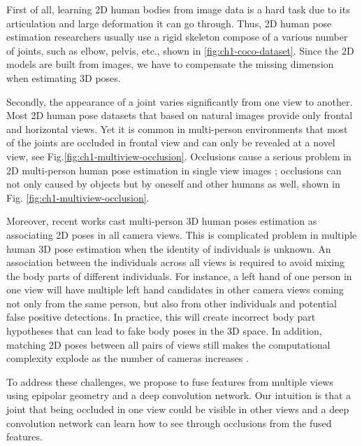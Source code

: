 First of all, learning 2D human bodies from image data is a hard task due to its articulation and large deformation it can go through. Thus, 2D human pose estimation researchers usually use a rigid skeleton compose of a various number of joints, such as elbow, pelvis, etc., shown in \ref{fig:ch1-coco-dataset}. Since the 2D models are built from images, we have to compensate the missing dimension when estimating 3D poses. 

Secondly, the appearance of a joint varies significantly from one view to another. Most 2D human pose datasets that based on natural images provide only frontal and horizontal views. Yet it is common in multi-person environments that most of the joints are occluded in frontal view and can only be revealed at a novel view, see Fig.\ref{fig:ch1-multiview-occlusion}. Occlusions cause a serious problem in 2D multi-person human pose estimation in single view images \cite{Sarandi18IROSW}; occlusions can not only caused by objects but by oneself and other humans as well, shown in Fig. \ref{fig:ch1-multiview-occlusion}.

Moreover, recent works \cite{20204DAssociation, multiviewpose, dong2019fast, 20143DPictorial} cast multi-person 3D human poses estimation as associating 2D poses in all camera views. This is complicated problem in multiple human 3D pose estimation when the identity of individuals is unknown. An association between the individuals across all views is required to avoid mixing the body parts of different individuals. For instance, a left hand of one person in one view will have multiple left hand candidates in other camera views coming not only from the same person, but also from other individuals and potential false positive detections. In practice, this will create incorrect body part hypotheses that can lead to fake body poses in the 3D space. In addition, matching 2D poses between all pairs of views still makes the computational complexity explode as the number of cameras increases \cite{Chen_2020_CVPR} . 

To address these challenges, we propose to fuse features from multiple views using epipolar geometry and a deep convolution network. Our intuition is that a joint that being occluded in one view could be visible in other views and a deep convolution network can learn how to see through occlusions from the fused features.

